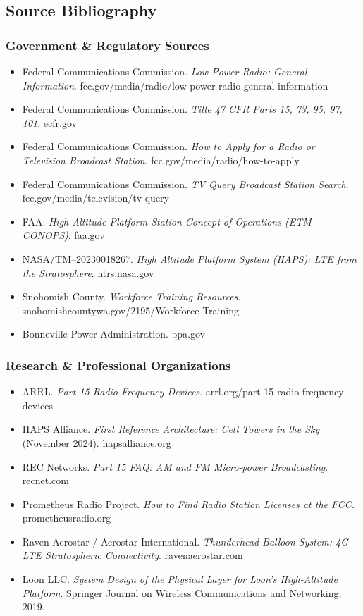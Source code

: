 \documentclass[11pt,letterpaper]{article}
\begin{document}
\subsection{Source Bibliography}

\subsubsection{Government \& Regulatory Sources}
\begin{itemize}
  \item Federal Communications Commission. \textit{Low Power Radio: General Information}. fcc.gov/media/radio/low-power-radio-general-information
  \item Federal Communications Commission. \textit{Title 47 CFR Parts 15, 73, 95, 97, 101}. ecfr.gov
  \item Federal Communications Commission. \textit{How to Apply for a Radio or Television Broadcast Station}. fcc.gov/media/radio/how-to-apply
  \item Federal Communications Commission. \textit{TV Query Broadcast Station Search}. fcc.gov/media/television/tv-query
  \item FAA. \textit{High Altitude Platform Station Concept of Operations (ETM CONOPS)}. faa.gov
  \item NASA/TM--20230018267. \textit{High Altitude Platform System (HAPS): LTE from the Stratosphere}. ntrs.nasa.gov
  \item Snohomish County. \textit{Workforce Training Resources}. snohomishcountywa.gov/2195/Workforce-Training
  \item Bonneville Power Administration. bpa.gov
\end{itemize}

\subsubsection{Research \& Professional Organizations}
\begin{itemize}
  \item ARRL. \textit{Part 15 Radio Frequency Devices}. arrl.org/part-15-radio-frequency-devices
  \item HAPS Alliance. \textit{First Reference Architecture: Cell Towers in the Sky} (November 2024). hapsalliance.org
  \item REC Networks. \textit{Part 15 FAQ: AM and FM Micro-power Broadcasting}. recnet.com
  \item Prometheus Radio Project. \textit{How to Find Radio Station Licenses at the FCC}. prometheusradio.org
  \item Raven Aerostar / Aerostar International. \textit{Thunderhead Balloon System: 4G LTE Stratospheric Connectivity}. ravenaerostar.com
  \item Loon LLC. \textit{System Design of the Physical Layer for Loon's High-Altitude Platform}. Springer Journal on Wireless Communications and Networking, 2019.
\end{itemize}
\end{document}
